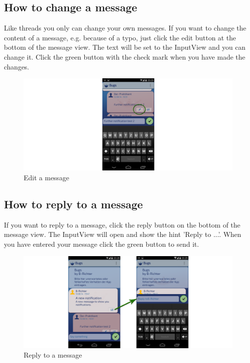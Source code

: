 \documentclass[12pt,a4paper,oneside]{report}
\begin{document}
\subsection{How to change a message}
Like threads you only can change your own messages. If you want to change the content of a message, e.g. because of a typo, just click the edit button at the bottom of the message view. The text will be set to the InputView and you can change it. Click the green button with the check mark when you have made the changes. 

\begin{figure}[!ht]
    \includegraphics[width=\linewidth]{ChangeMsg.png}
    \caption{Edit a message}
\end{figure}

\subsection{How to reply to a message}
If you want to reply to a message, click the reply button on the bottom of the message view. The InputView will open and show the hint 'Reply to ...'. When you have entered your message click the green button to send it.

\begin{figure}[!ht]
    \includegraphics[width=\linewidth]{ReplyMsg.png}
    \caption{Reply to a message}
\end{figure}
\end{document}
